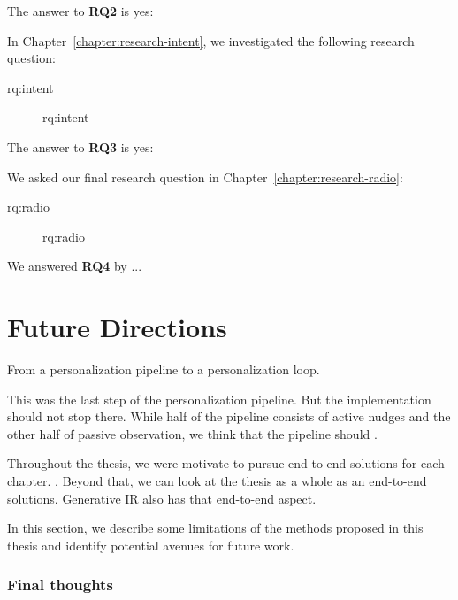 \noindent
The answer to \textbf{RQ2} is yes:

In Chapter~\ref{chapter:research-intent}, we investigated the following research question:

\begin{description}\item[\acs{rq:intent}]\acl{rq:intent}\end{description}

\noindent
The answer to \textbf{RQ3} is yes: 

We asked our final research question in Chapter~\ref{chapter:research-radio}:

\begin{description}\item[\acs{rq:radio}]\acl{rq:radio}\end{description}

\noindent
We answered \textbf{RQ4} by ...

\section{Future Directions}
\label{section:conclusion-futurework}

From a personalization pipeline to a personalization loop.

This was the last step of the personalization pipeline. But the implementation should not stop there. While half of the pipeline consists of active nudges and the other half of passive observation, we think that the pipeline should .

Throughout the thesis, we were motivate to pursue end-to-end solutions for each chapter. . Beyond that, we can look at the thesis as a whole as an end-to-end solutions. Generative IR also has that end-to-end aspect.

In this section, we describe some limitations of the methods proposed in this thesis and identify potential avenues for future work. 

\pagebreak

\subsubsection{Final thoughts} 






